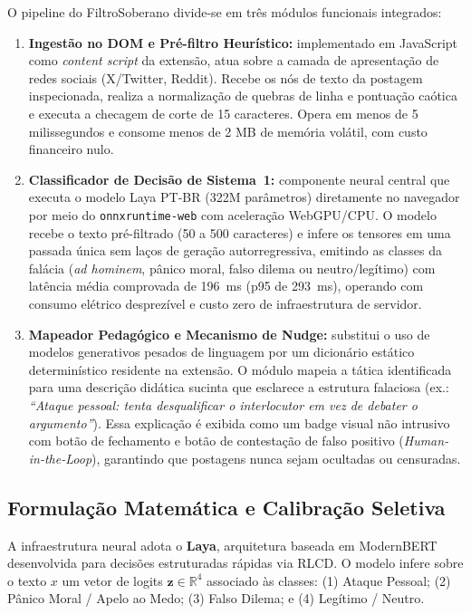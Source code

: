 \documentclass[runningheads]{llncs}
\begin{document}
O pipeline do FiltroSoberano divide-se em três módulos funcionais integrados:
\begin{enumerate}
    \item \textbf{Ingestão no DOM e Pré-filtro Heurístico:} implementado em JavaScript como \textit{content script} da extensão, atua sobre a camada de apresentação de redes sociais (X/Twitter, Reddit). Recebe os nós de texto da postagem inspecionada, realiza a normalização de quebras de linha e pontuação caótica e executa a checagem de corte de 15 caracteres. Opera em menos de 5 milissegundos e consome menos de 2 MB de memória volátil, com custo financeiro nulo.
    \item \textbf{Classificador de Decisão de Sistema~1:} componente neural central que executa o modelo Laya PT-BR (322M parâmetros) diretamente no navegador por meio do \texttt{onnxruntime-web} com aceleração WebGPU/CPU. O modelo recebe o texto pré-filtrado (50 a 500 caracteres) e infere os tensores em uma passada única sem laços de geração autorregressiva, emitindo as classes da falácia (\textit{ad hominem}, pânico moral, falso dilema ou neutro/legítimo) com latência média comprovada de 196~ms (p95 de 293~ms), operando com consumo elétrico desprezível e custo zero de infraestrutura de servidor.
    \item \textbf{Mapeador Pedagógico e Mecanismo de Nudge:} substitui o uso de modelos generativos pesados de linguagem por um dicionário estático determinístico residente na extensão. O módulo mapeia a tática identificada para uma descrição didática sucinta que esclarece a estrutura falaciosa (ex.: \textit{``Ataque pessoal: tenta desqualificar o interlocutor em vez de debater o argumento''}). Essa explicação é exibida como um badge visual não intrusivo com botão de fechamento e botão de contestação de falso positivo (\textit{Human-in-the-Loop}), garantindo que postagens nunca sejam ocultadas ou censuradas.
\end{enumerate}

\subsection{Formulação Matemática e Calibração Seletiva}

A infraestrutura neural adota o \textbf{Laya}, arquitetura baseada em ModernBERT~\cite{warner2025smarter} desenvolvida para decisões estruturadas rápidas via RLCD. O modelo infere sobre o texto $x$ um vetor de logits $\mathbf{z} \in \mathbb{R}^4$ associado às classes: (1) Ataque Pessoal; (2) Pânico Moral / Apelo ao Medo; (3) Falso Dilema; e (4) Legítimo / Neutro.
\end{document}
